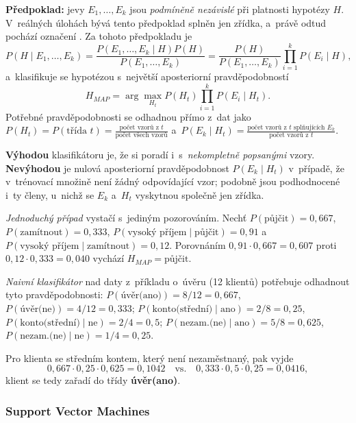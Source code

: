 \documentclass[11pt,a4paper]{article}
\theoremstyle{definition}
\begin{document}
\begin{defbox}
\textbf{Předpoklad:} jevy $E_1,\dots,E_k$ jsou \emph{podmíněně nezávislé} při platnosti
hypotézy $H$. V~reálných úlohách bývá tento předpoklad splněn jen zřídka, a~právě odtud
pochází označení . Za tohoto předpokladu je
\[ P(H\mid E_1,\dots,E_k)=\frac{P(E_1,\dots,E_k\mid H)P(H)}{P(E_1,\dots,E_k)}
   =\frac{P(H)}{P(E_1,\dots,E_k)}\prod_{i=1}^{k}P(E_i\mid H), \]
a~klasifikuje se hypotézou s~největší aposteriorní pravděpodobností
\[ H_{MAP}=\arg\max_{H_t} P(H_t)\prod_{i=1}^{k}P(E_i\mid H_t). \]
Potřebné pravděpodobnosti se odhadnou přímo z~dat jako
$P(H_t)=P(\text{třída }t)=\frac{\text{počet vzorů z~}t}{\text{počet všech
vzorů}}$ a~$P(E_k\mid H_t)=\frac{\text{počet vzorů z~}t\text{ splňujících }E_k}
{\text{počet vzorů z~}t}$.

\textbf{Výhodou} klasifikátoru je, že si poradí i~s~\emph{nekompletně popsanými} vzory.
\textbf{Nevýhodou} je nulová aposteriorní pravděpodobnost $P(E_k\mid H_t)$ v~případě, že
v~trénovací množině není žádný odpovídající vzor; podobně jsou podhodnocené i~ty členy,
u~nichž se $E_k$ a~$H_t$ vyskytnou společně jen zřídka.
\end{defbox}

\begin{defbox}
\emph{Jednoduchý případ} vystačí s~jediným pozorováním. Nechť
$P(\text{půjčit})=0{,}667$, $P(\text{zamítnout})=0{,}333$,
$P(\text{vysoký příjem}\mid\text{půjčit})=0{,}91$ a~
$P(\text{vysoký příjem}\mid\text{zamítnout})=0{,}12$. Porovnáním
$0{,}91\cdot 0{,}667=0{,}607$ proti $0{,}12\cdot 0{,}333=0{,}040$ vychází
$H_{MAP}=\text{půjčit}$.

\emph{Naivní klasifikátor} nad daty z~příkladu o~úvěru (12 klientů) potřebuje odhadnout tyto
pravděpodobnosti:
$P(\text{úvěr(ano)})=8/12=0{,}667$, $P(\text{úvěr(ne)})=4/12=0{,}333$;
$P(\text{konto(střední)}\mid\text{ano})=2/8=0{,}25$,
$P(\text{konto(střední)}\mid\text{ne})=2/4=0{,}5$;
$P(\text{nezam.(ne)}\mid\text{ano})=5/8=0{,}625$,
$P(\text{nezam.(ne)}\mid\text{ne})=1/4=0{,}25$.

Pro klienta se středním kontem, který není nezaměstnaný, pak vyjde
\[ 0{,}667\cdot 0{,}25\cdot 0{,}625=0{,}1042 \quad\text{vs.}\quad
   0{,}333\cdot 0{,}5\cdot 0{,}25=0{,}0416, \]
klient se tedy zařadí do třídy \textbf{úvěr(ano)}.
\end{defbox}

\subsubsection{Support Vector Machines}
\end{document}
